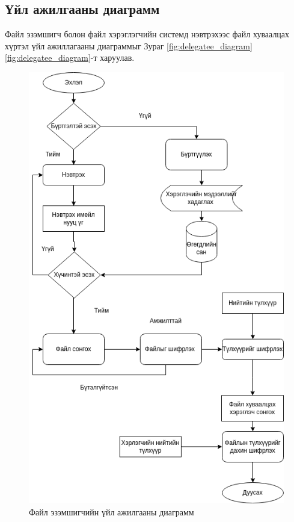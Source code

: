 \subsection*{Үйл ажилгааны диаграмм}
Файл эзэмшигч болон файл хэрэглэгчийн системд нэвтрэхээс файл хуваалцах хүртэл үйл ажиллагааны диаграммыг Зураг \ref{fig:delegatee_diagram} \ref{fig:delegatee_diagram}-т харуулав.
\begin{figure}[H]
    \centering
    \includegraphics[scale=0.5]{Figures/delegator.drawio.png}
    \caption[pyUmbral]{Файл эзэмшигчийн үйл ажилгааны диаграмм}
    \label{fig:delegator_diagram}
\end{figure}

